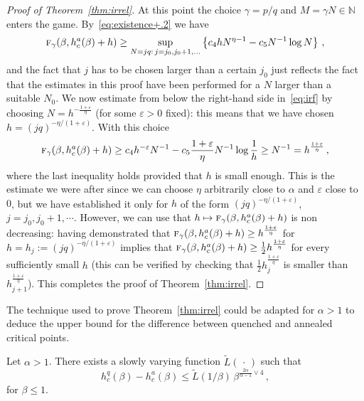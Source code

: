 \documentclass[AHL,Unicode,longabstracts]{cedram}
\newcommand{\ga}{\alpha}
\newcommand{\gb}{\beta}
\newcommand{\gep}{\varepsilon}
\newcommand{\tf}{\textsc{f}} %
\renewcommand{\tilde}{\widetilde}
\newcommand{\bbN}{\ensuremath{\mathbb{N}}}
\begin{document}
\begin{proof}[Proof of Theorem~\ref{thm:irrel}]
At this point the choice $\gamma=p/q$ and $M=\gamma N \in \bbN$ enters the game. By~\eqref{eq:existence+.2} we have
\begin{equation}\label{eq:irf}
\tf_{\gamma}(\gb,h_c^a(\gb) +h) \geq \sup_{N=jq :\,j =j_0, j_0+1, \ldots} \left\{ c_4 h N^{\eta-1} - c_5 N^{-1} \log N \right\}\,,
\end{equation}
and the fact that $j$ has to be chosen larger than a certain $j_0$ just reflects the fact that the estimates in this proof have been performed for a $N$ larger than a suitable $N_0$. We now estimate from below the right-hand side in~\eqref{eq:irf} by choosing $N= h^{-\frac{1+\gep}{\eta}}$ (for some $\gep>0$ fixed): this means that we have chosen $h=(jq)^{-\eta/(1+\gep)}$. With this choice
\begin{equation}
\tf_{\gamma}(\gb,h_c^a(\gb) +h) \geq c_4 h^{-\gep} N^{-1} - c_5 \frac{1+\gep}{\eta} N^{-1} \log \frac 1h \geq N^{-1} = h^{\frac{1+\gep}{\eta}}\,,
\end{equation}
where the last inequality holds provided that $h$ is small enough. This is the estimate we were after since we can choose $\eta$ arbitrarily close to $\ga$ and $\gep$ close to $0$, but we have established it only for $h$ of the form $(jq)^{-\eta/(1+\gep)}$, $j=j_0, j_0+1, \cdots$. However, we can use that $h\mapsto \tf_{\gamma}(\gb,h_c^a(\gb) +h)$ is non decreasing: having demonstrated that $\tf_{\gamma}(\gb,h_c^a(\gb) +h)\ge h^{\frac{1+\gep}{\eta}}$ for $h=h_j:=(jq)^{-\eta/(1+\gep)}$ implies that $\tf_{\gamma}(\gb,h_c^a(\gb) +h)\ge \tfrac12 h^{\frac{1+\gep}{\eta}}$ for every sufficiently small $h$ (this can be verified by checking that $\tfrac12 h_j^{\frac{1+\gep}{\eta}}$ is smaller than $h_{j+1}^{\frac{1+\gep}{\eta}}$). This completes the proof of Theorem~\ref{thm:irrel}.
\end{proof}





The technique used to prove Theorem~\ref{thm:irrel} could be adapted for $\ga >1$ to deduce the upper bound for the difference between quenched and annealed critical points.

\begin{prop}
Let $\ga >1$. There exists a slowly varying function $\tilde{L}({\,\cdot\,})$ such that
\begin{equation}
h_c^q(\beta) - h_c^a (\beta) \le
\tilde{L}(1/\gb)\,\gb^{\frac{2\ga}{\ga-1} \vee 4}\,,
\end{equation}
for $\beta \le 1$.
\end{prop}
\end{document}
